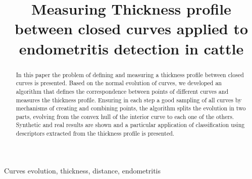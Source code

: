 \documentclass{article}
\title{Measuring Thickness profile between closed curves applied to
  endometritis detection in cattle}
\begin{document}
\maketitle

\begin{abstract}
In this paper the problem of defining and measuring a thickness profile between closed curves is presented. Based on the normal evolution of curves, we developed an algorithm that defines the correspondence between points of different curves and measures the thickness profile. Ensuring in each step a good sampling of all curves by mechanisms of creating and combining points, the algorithm splits the evolution in two parts, evolving from the convex hull of the interior curve to each one of the others. Synthetic and real results are shown and a particular application of classification using descriptors extracted from the thickness profile is presented.
\end{abstract}

\begin{keywords}
Curves evolution, thickness, distance, endometritis
\end{keywords}
\end{document}
